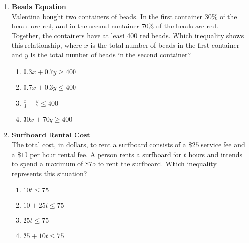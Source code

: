 \begin{enumerate}
\begin{subanswer}
\end{subanswer}

\item \textbf{Beads Equation}\\
Valentina bought two containers of beads. In the first container 30\% of the beads are red, and in the second container $70 \%$ of the beads are red. Together, the containers have at least 400 red beads. Which inequality shows this relationship, where $x$ is the total number of beads in the first container and $y$ is the total number of beads in the second container?
\begin{enumerate}[label=(\Alph*)]
  \item $0.3x + 0.7y \geq 400$
  \item $0.7x + 0.3y \leq 400$
  \item $\frac{x}{3} + \frac{y}{7} \leq 400$
  \item $30x + 70y \geq 400$
\end{enumerate}
\begin{subanswer}
\end{subanswer}

\item \textbf{Surfboard Rental Cost}\\
The total cost, in dollars, to rent a surfboard consists of a $\$ 25$ service fee and a $\$ 10$ per hour rental fee. A person rents a surfboard for $t$ hours and intends to spend a maximum of $\$ 75$ to rent the surfboard. Which inequality represents this situation?
\begin{enumerate}[label=(\Alph*)]
  \item $10t \leq 75$
  \item $10 + 25t \leq 75$
  \item $25t \leq 75$
  \item $25 + 10t \leq 75$
\end{enumerate}
\begin{subanswer}
\end{subanswer}

\newpage


\end{enumerate}
